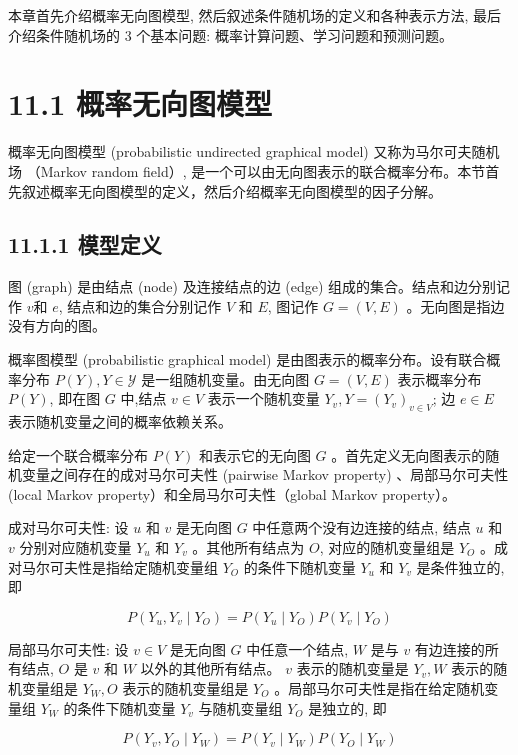 \documentclass[10pt]{article}
\begin{document}
\begin{CJK*}{UTF8}{bsmi}
本章首先介绍概率无向图模型, 然后叙述条件随机场的定义和各种表示方法, 最后介绍条件随机场的 3 个基本问题: 概率计算问题、学习问题和预测问题。

\section*{11.1 概率无向图模型}
概率无向图模型 (probabilistic undirected graphical model) 又称为马尔可夫随机场 （Markov random field）, 是一个可以由无向图表示的联合概率分布。本节首先叙述概率无向图模型的定义，然后介绍概率无向图模型的因子分解。

\subsection*{11.1.1 模型定义}
图 (graph) 是由结点 (node) 及连接结点的边 (edge) 组成的集合。结点和边分别记作 $v$和 $e$, 结点和边的集合分别记作 $V$ 和 $E$, 图记作 $G=(V, E)$ 。无向图是指边没有方向的图。

概率图模型 (probabilistic graphical model) 是由图表示的概率分布。设有联合概率分布 $P(Y), Y \in \mathcal{Y}$ 是一组随机变量。由无向图 $G=(V, E)$ 表示概率分布 $P(Y)$, 即在图 $G$ 中,结点 $v \in V$ 表示一个随机变量 $Y_{v}, Y=\left(Y_{v}\right)_{v \in V}$; 边 $e \in E$ 表示随机变量之间的概率依赖关系。

给定一个联合概率分布 $P(Y)$ 和表示它的无向图 $G$ 。首先定义无向图表示的随机变量之间存在的成对马尔可夫性 (pairwise Markov property) 、局部马尔可夫性 (local Markov property）和全局马尔可夫性（global Markov property）。

成对马尔可夫性: 设 $u$ 和 $v$ 是无向图 $G$ 中任意两个没有边连接的结点, 结点 $u$ 和 $v$ 分别对应随机变量 $Y_{u}$ 和 $Y_{v}$ 。其他所有结点为 $O$, 对应的随机变量组是 $Y_{O}$ 。成对马尔可夫性是指给定随机变量组 $Y_{O}$ 的条件下随机变量 $Y_{u}$ 和 $Y_{v}$ 是条件独立的, 即


\begin{equation*}
P\left(Y_{u}, Y_{v} \mid Y_{O}\right)=P\left(Y_{u} \mid Y_{O}\right) P\left(Y_{v} \mid Y_{O}\right) \tag{11.1}
\end{equation*}


局部马尔可夫性: 设 $v \in V$ 是无向图 $G$ 中任意一个结点, $W$ 是与 $v$ 有边连接的所有结点, $O$ 是 $v$ 和 $W$ 以外的其他所有结点。 $v$ 表示的随机变量是 $Y_{v}, W$ 表示的随机变量组是 $Y_{W}, O$ 表示的随机变量组是 $Y_{O}$ 。局部马尔可夫性是指在给定随机变量组 $Y_{W}$ 的条件下随机变量 $Y_{v}$ 与随机变量组 $Y_{O}$ 是独立的, 即


\begin{equation*}
P\left(Y_{v}, Y_{O} \mid Y_{W}\right)=P\left(Y_{v} \mid Y_{W}\right) P\left(Y_{O} \mid Y_{W}\right) \tag{11.2}
\end{equation*}



\end{CJK*}
\end{document}
